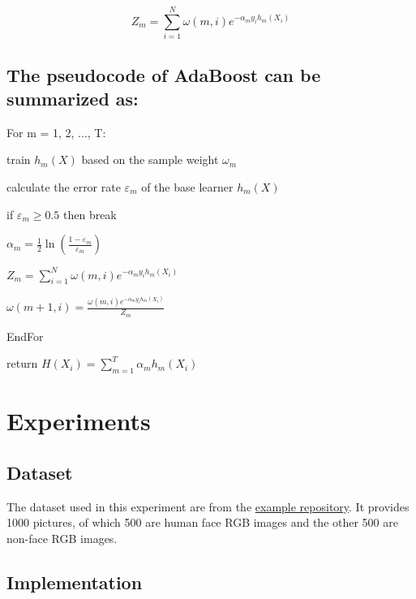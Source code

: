 \documentclass[journal, a4paper]{IEEEtran}
\begin{document}
\begin{equation}
Z_{m}=\sum_{i=1}^{N}{\omega\left(m,i\right)e^{-\alpha_my_ih_m\left(X_i\right)}}
\end{equation}

    \subsection*{The pseudocode of AdaBoost can be summarized as: }

\begin{framed}

\noindent For m = 1, 2, ..., T: 

    train $h_m\left(X\right)$ based on the sample weight $\omega_m$

    calculate the error rate $\varepsilon_m$ of the base learner $h_m\left(X\right)$

    if $\varepsilon_m\ge0.5$ then break 

$\alpha_m=\frac{1}{2}\ln\left(\frac{1-\varepsilon_m}{\varepsilon_m}\right)$ 

$Z_{m}=\sum_{i=1}^{N}{\omega\left(m,i\right)e^{-\alpha_my_ih_m\left(X_i\right)}}$

$\omega\left(m+1,i\right)=\frac{\omega\left(m,i\right)e^{-\alpha_my_ih_m\left(X_i\right)}}{Z_{m}}$

\noindent EndFor

\noindent return $H\left(X_i\right)=\sum_{m=1}^{T}{\alpha_mh_m\left(X_i\right)}$

\end{framed}

\section{Experiments}
\subsection{Dataset}
The dataset used in this experiment are from the \href{https://github.com/wujiaju/ML2018-lab-03}{example repository}. It provides 1000 pictures, of which 500 are human face RGB images and the other 500 are non-face RGB images. 

\subsection{Implementation}
\end{document}

